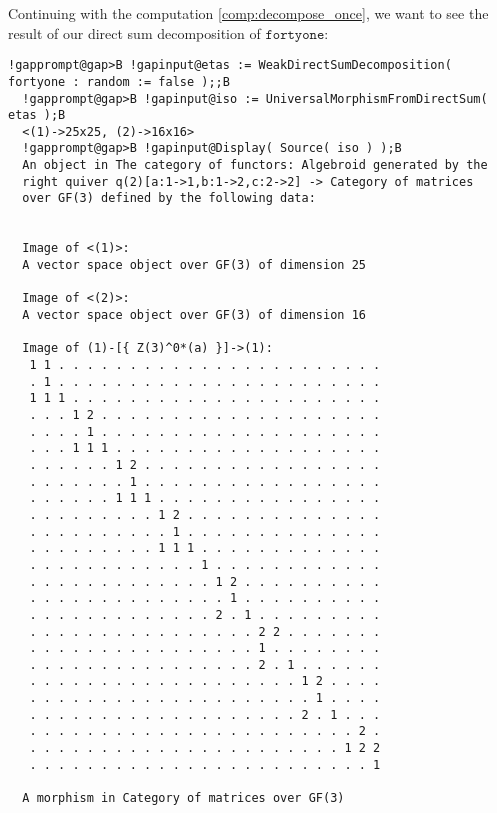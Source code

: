 \begin{computation}\label{comp:direct_sum_decomposition}
Continuing with the computation \ref{comp:decompose_once}, we want to see the result of our direct sum decomposition
of $\mathtt{fortyone}$:

\begin{Verbatim}[commandchars=!@B,fontsize=\small,frame=single,label=Example]
  !gapprompt@gap>B !gapinput@etas := WeakDirectSumDecomposition( fortyone : random := false );;B
  !gapprompt@gap>B !gapinput@iso := UniversalMorphismFromDirectSum( etas );B
  <(1)->25x25, (2)->16x16>
  !gapprompt@gap>B !gapinput@Display( Source( iso ) );B
  An object in The category of functors: Algebroid generated by the
  right quiver q(2)[a:1->1,b:1->2,c:2->2] -> Category of matrices
  over GF(3) defined by the following data:
  
  
  Image of <(1)>:
  A vector space object over GF(3) of dimension 25
  
  Image of <(2)>:
  A vector space object over GF(3) of dimension 16
  
  Image of (1)-[{ Z(3)^0*(a) }]->(1):
   1 1 . . . . . . . . . . . . . . . . . . . . . . .
   . 1 . . . . . . . . . . . . . . . . . . . . . . .
   1 1 1 . . . . . . . . . . . . . . . . . . . . . .
   . . . 1 2 . . . . . . . . . . . . . . . . . . . .
   . . . . 1 . . . . . . . . . . . . . . . . . . . .
   . . . 1 1 1 . . . . . . . . . . . . . . . . . . .
   . . . . . . 1 2 . . . . . . . . . . . . . . . . .
   . . . . . . . 1 . . . . . . . . . . . . . . . . .
   . . . . . . 1 1 1 . . . . . . . . . . . . . . . .
   . . . . . . . . . 1 2 . . . . . . . . . . . . . .
   . . . . . . . . . . 1 . . . . . . . . . . . . . .
   . . . . . . . . . 1 1 1 . . . . . . . . . . . . .
   . . . . . . . . . . . . 1 . . . . . . . . . . . .
   . . . . . . . . . . . . . 1 2 . . . . . . . . . .
   . . . . . . . . . . . . . . 1 . . . . . . . . . .
   . . . . . . . . . . . . . 2 . 1 . . . . . . . . .
   . . . . . . . . . . . . . . . . 2 2 . . . . . . .
   . . . . . . . . . . . . . . . . 1 . . . . . . . .
   . . . . . . . . . . . . . . . . 2 . 1 . . . . . .
   . . . . . . . . . . . . . . . . . . . 1 2 . . . .
   . . . . . . . . . . . . . . . . . . . . 1 . . . .
   . . . . . . . . . . . . . . . . . . . 2 . 1 . . .
   . . . . . . . . . . . . . . . . . . . . . . . 2 .
   . . . . . . . . . . . . . . . . . . . . . . 1 2 2
   . . . . . . . . . . . . . . . . . . . . . . . . 1
  
  A morphism in Category of matrices over GF(3)
  

\end{Verbatim}
\end{computation}
